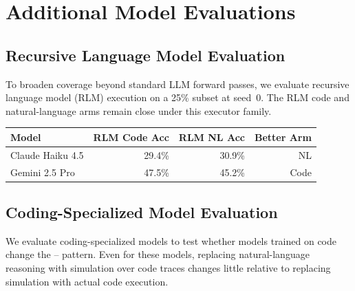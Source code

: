 
\section{Additional Model Evaluations}
\label{app:additional_model_evaluations}

\subsection{Recursive Language Model Evaluation}
\label{app:recursive_language_model_evaluation}

To broaden coverage beyond standard LLM forward passes, we evaluate recursive
language model (RLM) execution on a 25\% subset at seed~0. The RLM code and
natural-language arms remain close under this executor family.

\begin{appendixtableblock}
\small
\begin{tabular*}{\linewidth}{@{\extracolsep{\fill}}lrrr@{}}
\toprule
Model & RLM Code Acc & RLM NL Acc & Better Arm \\
\midrule
Claude Haiku 4.5 & 29.4\% & 30.9\% & NL \\
Gemini 2.5 Pro & 47.5\% & 45.2\% & Code \\
\bottomrule
\end{tabular*}
\label{tab:appendix_rlm}
\end{appendixtableblock}


\subsection{Coding-Specialized Model Evaluation}
\label{app:coding_specialized_model_evaluation}

We evaluate coding-specialized models to test whether models trained on code
change the \RouteTwo{}--\RouteOne{} pattern. Even for these models, replacing
natural-language reasoning with simulation over code traces changes little
relative to replacing simulation with actual code execution.

